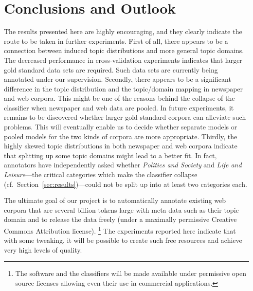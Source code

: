 \documentclass[11pt]{article}
\begin{document}
\section{Conclusions and Outlook}
\label{sec:conclusions}

The results presented here are highly encouraging, and they clearly indicate the route to be taken in further experiments.
First of all, there appears to be a connection between induced topic distributions and more general topic domains.
The decreased performance in cross-validation experiments indicates that larger gold standard data sets are required.
Such data sets are currently being annotated under our supervision.
Secondly, there appears to be a significant difference in the topic distribution and the topic\slash domain mapping in newspaper and web corpora.
This might be one of the reasons behind the collapse of the classifier when newspaper and web data are pooled.
In future experiments, it remains to be discovered whether larger gold standard corpora can alleviate such problems.
This will eventually enable us to decide whether separate models or pooled models for the two kinds of corpora are more appropriate.
Thirdly, the highly skewed topic distributions in both newspaper and web corpora indicate that splitting up some topic domains might lead to a better fit.
In fact, annotators have independently asked whether \textit{Politics and Society} and \textit{Life and Leisure}---the critical categories which make the classifier collapse (cf.\ Section~\ref{sec:results})---could not be split up into at least two categories each.

The ultimate goal of our project is to automatically annotate existing web corpora that are several billion tokens large with meta data such as their topic domain and to release the data freely (under a maximally permissive Creative Commons Attribution license).%
\footnote{The software and the classifiers will be made available under permissive open source licenses allowing even their use in commercial applications.}
The experiments reported here indicate that with some tweaking, it will be possible to create such free resources and achieve very high levels of quality.



\end{document}
